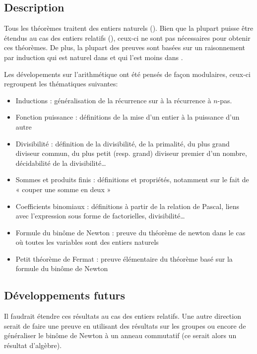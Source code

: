 \subsection{Description}

Tous les théorèmes traitent des entiers naturels (). Bien que la plupart puisse être étendus au cas des entiers relatifs (), ceux-ci ne sont pas nécessaires pour obtenir ces théorèmes. De plus, la plupart des preuves sont basées sur un raisonnement par induction qui est naturel dans  et qui l'est moins dans .

Les dévelopements sur l'arithmétique ont été pensés de façon modulaires, ceux-ci regroupent les thématiques suivantes:
\begin{itemize}
 \item Inductions : généralisation de la récurrence sur  à la récurrence à $n$-pas.
 \item Fonction puissance : définitions de la mise d'un entier à la puissance d'un autre
 \item Divisibilité : définition de la divisibilité, de la primalité, du plus grand diviseur commun, du plus petit (resp. grand) diviseur premier d'un nombre, décidabilité de la divisibilité\ldots
 \item Sommes et produits finis : définitions et propriétés, notamment sur le fait de « couper une somme en deux »
 \item Coefficients binomiaux : définitions à partir de la relation de Pascal, liens avec l'expression sous forme de factorielles, divisibilité\ldots
 \item Formule du binôme de Newton : preuve du théorème de newton dans le cas où toutes les variables sont des entiers naturels
 \item Petit théorème de Fermat : preuve élémentaire du théorème basé sur la formule du binôme de Newton
\end{itemize}

\subsection{Développements futurs}

Il faudrait étendre ces résultats au cas des entiers relatifs. Une autre direction serait de faire une preuve en utilisant des résultats sur les groupes ou encore de généraliser le binôme de Newton à un anneau commutatif (ce serait alors un résultat d'algèbre).
